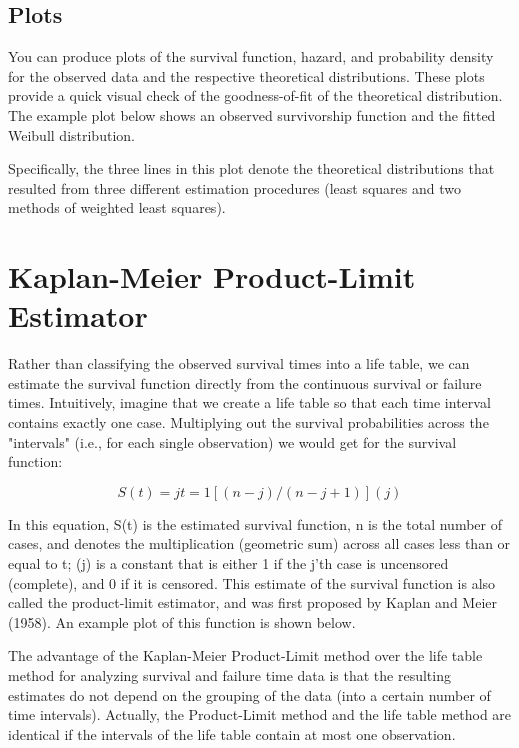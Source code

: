 \documentclass[11pt]{article} %
\begin{document}
\subsection{Plots} You can produce plots of the survival function, hazard, and probability density for the observed data and the respective theoretical distributions. These plots provide a quick visual check of the goodness-of-fit of the theoretical distribution. The example plot below shows an observed survivorship function and the fitted Weibull distribution.


Specifically, the three lines in this plot denote the theoretical distributions that resulted from three different estimation procedures (least squares and two methods of weighted least squares).

\newpage
\section{Kaplan-Meier Product-Limit Estimator}

Rather than classifying the observed survival times into a life table, we can estimate the survival function directly from the continuous survival or failure times. Intuitively, imagine that we create a life table so that each time interval contains exactly one case. Multiplying out the survival probabilities across the "intervals" (i.e., for each single observation) we would get for the survival function:

\[S(t) = jt= 1 [(n-j)/(n-j+1)]( j )\]

In this equation, S(t) is the estimated survival function, n is the total number of cases, and denotes the multiplication (geometric sum) across all cases less than or equal to t; (j) is a constant that is either 1 if the j'th case is uncensored (complete), and 0 if it is censored. This estimate of the survival function is also called the product-limit estimator, and was first proposed by Kaplan and Meier (1958). An example plot of this function is shown below.



The advantage of the Kaplan-Meier Product-Limit method over the life table method for analyzing survival and failure time data is that the resulting estimates do not depend on the grouping of the data (into a certain number of time intervals). Actually, the Product-Limit method and the life table method are identical if the intervals of the life table contain at most one observation.
\end{document}

